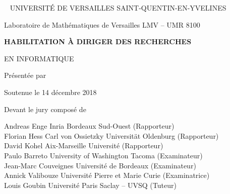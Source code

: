 


\begin{titlingpage}
  \setlength{\parindent}{0pt}
  
  \thispagestyle{insttitle}
  
  \begin{center}
    ~\vfill
    \Large{\MakeUppercase{Université de Versailles Saint-Quentin-en-Yvelines}}
    \par\vspace{\onelineskip}
    \Large{Laboratoire de Mathématiques de Versailles LMV -- UMR 8100}
    \par\vspace{3\onelineskip}
    \LARGE{\bf\MakeUppercase{Habilitation à diriger des recherches}}
    \par\vspace{\onelineskip}
    \Large{\MakeUppercase{en Informatique}}
    \par\vspace{2\onelineskip}
    \large{Présentée par}
    \par\vspace{0.5\onelineskip}
    \huge{\bf\MakeUppercase{\theauthor}}
    \par\vspace{2\onelineskip}
    \Huge{\bf\MakeUppercase{\thetitle}}
    \par\vspace{3\onelineskip}
    \large{Soutenue le 14 décembre 2018}
    \par\vfill
    \large{Devant le jury composé de}
    \par\vspace{\onelineskip}
    \normalsize
    Andreas Enge \hfill Inria Bordeaux Sud-Ouest \hfill (Rapporteur)\\
    Florian Hess \hfill Carl von Ossietzky Universität Oldenburg \hfill (Rapporteur)\\
    David Kohel \hfill Aix-Marseille Université \hfill (Rapporteur)\\
    Paulo Barreto \hfill University of Washington Tacoma \hfill (Examinateur)\\
    Jean-Marc Couveignes \hfill Université de Bordeaux \hfill (Examinateur)\\
    Annick Valibouze \hfill Université Pierre et Marie Curie \hfill (Examinatrice)\\
    Louis Goubin \hfill Université Paris Saclay -- UVSQ \hfill (Tuteur)
    \vfill
  \end{center}
  

\end{titlingpage}
